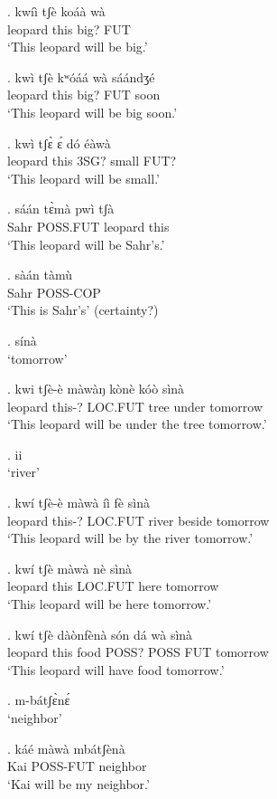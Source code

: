 \documentclass{assets/fieldnotes}
\begin{document}
{\exg. kwíì tʃè koáà wà \\
leopard this big? FUT \\
`This leopard will be big.'

\exg. kwì tʃè kʷóáá wà sáándʒé \\
leopard this big? FUT soon \\
`This leopard will be big soon.'

\exg. kwì tʃɛ̀ ɛ́ dó éàwà \\
leopard this 3SG? small FUT? \\
`This leopard will be small.'

\exg. sáán tɛ̀mà pwì tʃà \\
Sahr POSS.FUT leopard this \\
`This leopard will be Sahr's.'

\exg. sàán tàmù \\
Sahr POSS-COP \\
`This is Sahr's' (certainty?)

\ex. sínà \\
`tomorrow' 

\exg. kwi tʃè-è màwàŋ kònè kóò sìnà \\
leopard this-? LOC.FUT tree under tomorrow \\
`This leopard will be under the tree tomorrow.' %

\ex. ii \\
`river'

\exg. kwí tʃè-è màwà íì fè sìnà  \\
leopard this-? LOC.FUT river beside tomorrow \\
`This leopard will be by the river tomorrow.'

\exg. kwí tʃè màwà nè sìnà \\
leopard this LOC.FUT here tomorrow \\ 
`This leopard will be here tomorrow.'


\exg. kwí tʃè dàònfènà són dá wà sìnà \\
leopard this food POSS? POSS FUT tomorrow \\
`This leopard will have food tomorrow.'


\ex. m-bátʃɛ̀nɛ́ \\ 
`neighbor'

\exg. káé màwà mbátʃènà \\
Kai POSS-FUT neighbor \\
`Kai will be my neighbor.'

}
\end{document}

